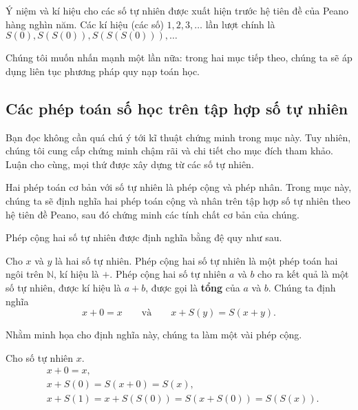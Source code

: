 Ý niệm và kí hiệu cho các số tự nhiên được xuất hiện trước hệ tiên đề của Peano hàng nghìn năm. Các kí hiệu (các số) $1, 2, 3,\ldots$ lần lượt chính là $S(0), S(S(0)), S(S(S(0))),\ldots$

Chúng tôi muốn nhấn mạnh một lần nữa: trong hai mục tiếp theo, chúng ta sẽ áp dụng liên tục phương pháp quy nạp toán học.

\subsection*{Các phép toán số học trên tập hợp số tự nhiên}

Bạn đọc không cần quá chú ý tới kĩ thuật chứng minh trong mục này. Tuy nhiên, chúng tôi cung cấp chứng minh chậm rãi và chi tiết cho mục đích tham khảo. Luận cho cùng, mọi thứ được xây dựng từ các số tự nhiên.

Hai phép toán cơ bản với số tự nhiên là phép cộng và phép nhân. Trong mục này, chúng ta sẽ định nghĩa hai phép toán cộng và nhân trên tập hợp số tự nhiên theo hệ tiên đề Peano, sau đó chứng minh các tính chất cơ bản của chúng.

Phép cộng hai số tự nhiên được định nghĩa bằng đệ quy như sau.

\begin{definition}
	Cho $x$ và $y$ là hai số tự nhiên. Phép cộng hai số tự nhiên là một phép toán hai ngôi trên $\mathbb{N}$, kí hiệu là $+$. Phép cộng hai số tự nhiên $a$ và $b$ cho ra kết quả là một số tự nhiên, được kí hiệu là $a + b$, được gọi là \textbf{tổng} của $a$ và $b$. Chúng ta định nghĩa
	\[
		x + 0 = x\qquad\text{và}\qquad x + S(y) = S(x + y).
	\]
\end{definition}

Nhằm minh họa cho định nghĩa này, chúng ta làm một vài phép cộng.
\begin{example}
	Cho số tự nhiên $x$.
	\begin{align*}
		 & x + 0 = x,                                      \\
		 & x + S(0) = S(x + 0) = S(x),                     \\
		 & x + S(1) = x + S(S(0)) = S(x + S(0)) = S(S(x)).
	\end{align*}
\end{example}

